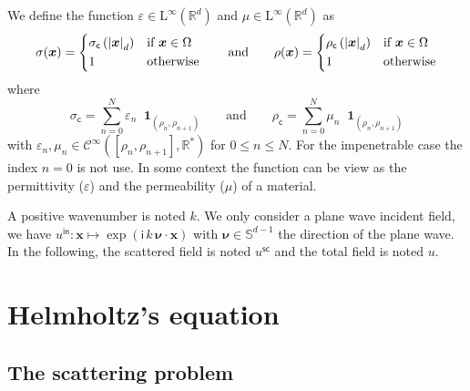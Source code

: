 \documentclass[12pt,a4paper]{article}
\theoremstyle{definition}
\theoremstyle{plain}
\theoremstyle{remark}
\newcommand{\bbR}{\mathbb{R}}
\newcommand{\bbS}{\mathbb{S}}
\newcommand{\scrC}{\mathscr{C}}
\newcommand{\rmL}{\mathrm{L}}
\newcommand{\im}{\mathsf{i}}
\newcommand{\Ind}[1]{\mathop{}\!\mathbf{1}_{#1}}
\newcommand{\plr}[1]{\left(#1\right)}
\newcommand{\abs}[1]{\left\lvert#1\right\rvert}
\newcommand{\vect}[1]{\boldsymbol{#1}}
\newcommand{\vx}{\boldsymbol{x}}
\newcommand{\eps}{\varepsilon}
\newcommand{\inc}{\mathsf{in}}
\newcommand{\sca}{\mathsf{sc}}
\newcommand{\scav}{\sigma_\mathsf{c}}
\newcommand{\rcav}{\rho_\mathsf{c}}
\begin{document}
We define the function \(\eps \in \rmL^\infty(\bbR^d)\) and \(\mu \in \rmL^\infty(\bbR^d)\) as
\[
    \sigma(\vx) = \begin{dcases}
        \scav\plr{\abs{\vx}_d} & \text{if } \vx \in \Omega \\
        1                      & \text{otherwise}
    \end{dcases} \qquad
    \text{and} \qquad
    \rho(\vx) = \begin{dcases}
        \rcav\plr{\abs{\vx}_d} & \text{if } \vx \in \Omega \\
        1                      & \text{otherwise}
    \end{dcases}
\]
where
\[
    \scav = \sum_{n = 0}^{N} \eps_n \Ind{(\rho_n, \rho_{n+1})} \qquad
    \text{and} \qquad
    \rcav = \sum_{n = 0}^{N} \mu_n \Ind{(\rho_n, \rho_{n+1})}
\]
with \(\eps_n, \mu_n \in \scrC^\infty([\rho_n, \rho_{n+1}], \bbR^*)\) for \(0 \le n \le N\).
For the impenetrable case the index \(n = 0\) is not use.
In some context the function can be view as the permittivity ($\eps$) and the permeability ($\mu$) of a material.

\bigskip

A positive wavenumber is noted \(k\).
We only consider a plane wave incident field, we have \(u^\inc : \vx \mapsto \exp(\im\, k\, \vect{\nu} \cdot \vx)\) with \(\vect{\nu} \in \bbS^{d-1}\) the direction of the plane wave.
In the following, the scattered field is noted \(u^\sca\) and the total field is noted \(u\).

\section{Helmholtz's equation}

\subsection{The scattering problem}
\end{document}
